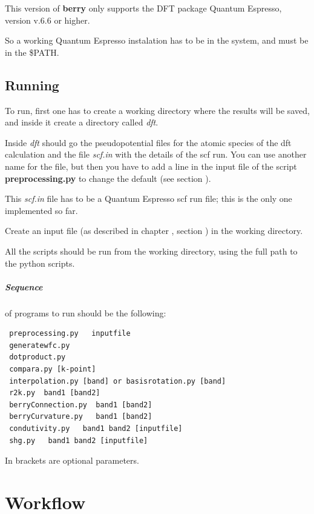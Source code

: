 \documentclass[a4paper,12pt]{report}
\begin{document}
This version of \textbf{berry} only supports the DFT package {\sc Quantum Espresso}, version v.6.6 or higher.

So a working {\sc Quantum Espresso} instalation has to be in the system, and must be in the \$PATH.

\section{Running}\label{sec:running}

 To run, first one has to create a working directory where the results will be saved,
 and inside it create a directory called \emph{dft}.

 Inside \emph{dft} should go the pseudopotential files for the atomic species of the dft calculation
and the file \emph{scf.in} with the details of the scf run.
You can use another name for the file, but then you have to add a line in the input file of
the script \textbf{preprocessing.py} to change the default (see section ).

 This \emph{scf.in} file has to be a {\sc Quantum Espresso} scf run file;
 this is the only one implemented so far.

 Create an input file (as described in chapter , section )
 in the working directory.

 All the scripts should be run from the working directory, using the full path to the python scripts.

\paragraph{Sequence} of programs to run should be the following:
\begin{verbatim}
 preprocessing.py   inputfile
 generatewfc.py
 dotproduct.py
 compara.py [k-point]
 interpolation.py [band] or basisrotation.py [band]
 r2k.py  band1 [band2]
 berryConnection.py  band1 [band2]
 berryCurvature.py   band1 [band2]
 condutivity.py   band1 band2 [inputfile]
 shg.py   band1 band2 [inputfile]
\end{verbatim}
In brackets are optional parameters.




\chapter{Workflow}\label{ch:workflow}
\end{document}

